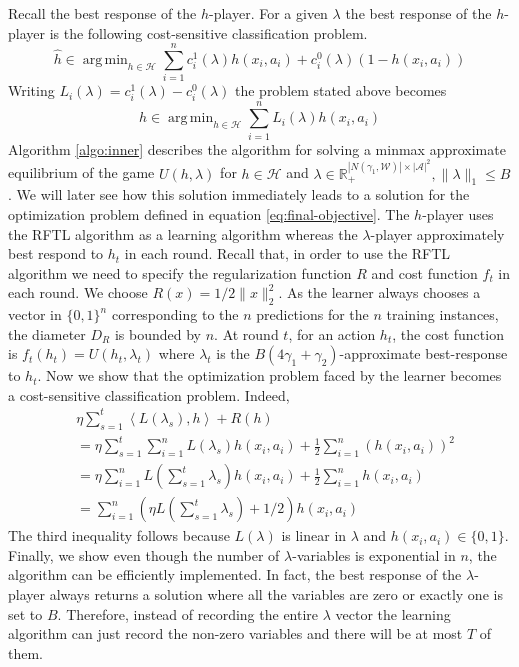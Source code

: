 \documentclass[11pt]{article}
\renewcommand{\hat}{\widehat}
\newcommand{\set}[1]{\{#1\}}
\newcommand{\bbR}{\mathbb{R}}
\DeclareMathOperator*{\argmin}{arg\,min}
\newcommand{\WW}{\mathcal{W}}
\newcommand{\abs}[1]{\left|#1\right|}
\newcommand{\Ac}{\mathcal{A}}
\newcommand{\HH}{\mathcal{H}}
\newcommand{\eps}{\varepsilon}
\newcommand{\norm}[1]{\lVert #1 \rVert}
\begin{document}
Recall the best response of the $h$-player. For a given $\lambda$ the best response of the $h$-player is the following cost-sensitive classification problem.
\begin{equation}
\hat{h} \in \argmin_{h \in \HH} \sum_{i=1}^n c^1_i (\lambda) h(x_i,a_i) + c^0_i(\lambda) (1 - h(x_i,a_i))
\end{equation}
Writing $L_i(\lambda) = c^1_i(\lambda) - c^0_i(\lambda)$ the problem stated above becomes
\begin{equation}
\hat{h} \in \argmin_{h \in \HH} \sum_{i=1}^n L_i(\lambda) h(x_i,a_i)
\end{equation}
Algorithm \ref{algo:inner} describes the algorithm for solving a minmax approximate equilibrium of the game $U(h,\lambda)$ for $h \in \HH$ and $\lambda \in \bbR^{\abs{N(\gamma_1,\WW)}\times \abs{\Ac}^2}_+, \norm{\lambda}_1 \le B$. We will later see how this solution immediately leads to a solution for the optimization problem defined in equation \ref{eq:final-objective}. The $h$-player uses the RFTL algorithm as a learning algorithm whereas the $\lambda$-player approximately best respond to $h_t$ in each round. Recall that, in order to use the RFTL algorithm we need to specify the regularization function $R$ and cost function $f_t$ in each round. We choose $R(x) = 1/2\norm{x}_2^2$. As the learner always chooses a vector in $\set{0,1}^n$ corresponding to the $n$ predictions for the $n$ training instances, the diameter $D_R$ is bounded by $n$. At round $t$, for an action $h_t$, the cost function is $f_t(h_t) = U(h_t,\lambda_t)$ where $\lambda_t$ is the $B(4\gamma_1 + \gamma_2)$-approximate best-response to $h_t$. Now we show that the optimization problem faced by the learner becomes a cost-sensitive classification problem. Indeed,
\begin{align*}
&\eta \sum_{s=1}^t \left \langle L(\lambda_s), h \right \rangle + R(h) \\
&= \eta \sum_{s=1}^t \sum_{i=1}^n L(\lambda_s) h(x_i,a_i) + \frac{1}{2} \sum_{i=1}^n (h(x_i,a_i))^2 \\
&= \eta \sum_{i=1}^n L(\sum_{s=1}^t \lambda_s) h(x_i,a_i) + \frac{1}{2} \sum_{i=1}^n h(x_i,a_i) \\
&= \sum_{i=1}^n (\eta L(\sum_{s=1}^t \lambda_s) + 1/2) h(x_i,a_i)
\end{align*}
The third inequality follows because $L(\lambda)$ is linear in $\lambda$ and $h(x_i,a_i) \in \set{0,1}$. Finally, we show even though the number of $\lambda$-variables is exponential in $n$, the algorithm can be efficiently implemented. In fact, the best response of the $\lambda$-player always returns a solution where all the variables are zero or exactly one is set to $B$. Therefore, instead of recording the entire $\lambda$ vector the learning algorithm can just record the non-zero variables and there will be at most $T$ of them.
\end{document}
